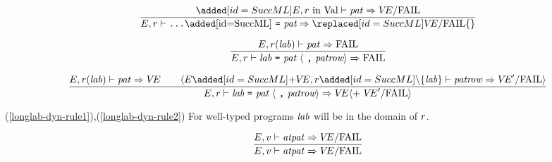 \begin{equation}	%
\frac{\ADD{\E,r\ \In\ \Val\ts\pat\ra\VE/\fail}}
     {\E,\r\ts\wildrec\ra\REPL{\VE/\fail }{\emptymap}}\index{56.2}
\end{equation}
 

\begin{equation}	%
\label{longlab-dyn-rule1}
\frac{\E,\r(\lab)\ts\pat\ra\FAIL}
     {\E,\r\ts\longlabpats\ra\FAIL}
\end{equation}

\begin{equation}	%
\label{longlab-dyn-rule2}
\frac{\E,\r(\lab)\ts\pat\ra\VE\qquad
      \langle\E\ADD{+\VE},\r\ADD{\setminus\{\lab\}}\ts\labpats\ra\VE'/\fail\rangle }
     {\E,\r\ts\longlabpats\ra
      \VE\langle +\ \VE'/\fail\rangle}
\end{equation}
\comments
\begin{description}
\item{(\ref{longlab-dyn-rule1}),(\ref{longlab-dyn-rule2})}
For well-typed programs ${\it lab}$ will be in the domain of $r$.
\end{description}

%
%

\begin{equation}	%
\frac{\E,\V\ts\atpat\ra \VE/\fail}
     {\E,\V\ts\atpat\ra \VE/\fail}\index{56.3}
\end{equation}


